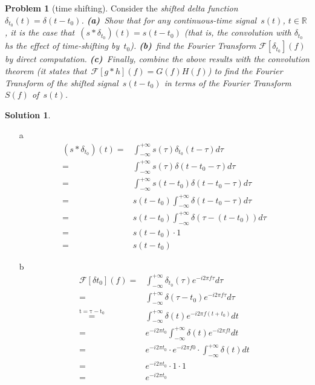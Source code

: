 \documentclass[11pt]{article}
\theoremstyle{plain}
\theoremstyle{definition}
\newtheorem{problem}{Problem}
\newtheorem{solution}{Solution}
\theoremstyle{remark}
\begin{document}
\begin{problem}[time shifting]
Consider the \em shifted \em delta function
$\delta_{t_0}(t)=\delta(t-t_0)$. {\bf(a)}~Show that
for any continuous-time signal~$s(t)$, $t\in \mathbb{R}$,
it is the case that~$(s\ast\delta_{t_0})(t)=s(t-t_0)$
(that is, the convolution with $\delta_{t_0}$ hs the effect
of time-shifting by~$t_0$). {\bf(b)}~find the 
Fourier Transform $\mathcal{F}[\delta_{t_0}](f)$
by direct computation.  
{\bf(c)}~Finally, 
combine the above results with the convolution theorem
(it states that~$\mathcal{F}[g\ast h](f)=G(f)H(f)$)
to find the Fourier Transform of the shifted signal~$s(t-t_0)$
in terms of the Fourier Transform~$S(f)$ of~$s(t)$.
\end{problem}
\begin{solution}
	\begin{enumerate}
		\item[a] 	
		\begin{eqnarray*}
			(s*\delta_{t_0})(t) = & \int_{-\infty}^{+\infty} s(\tau) \delta_{t_0} (t-\tau) d\tau\\
			= & \int_{-\infty}^{+\infty} s(\tau) \delta (t- t_0 -\tau) d\tau\\
			= & \int_{-\infty}^{+\infty} s(t-t_0) \delta(t-t_0 -\tau) d\tau \\
			= & s(t-t_0) \int_{-\infty}^{+\infty} \delta (t-t_0 -\tau) d\tau \\
			= & s(t-t_0) \int_{-\infty}^{+\infty} \delta (\tau - (t-t_0)) d\tau \\
			= & s(t-t_0) \cdot 1 \\
			= & s(t-t_0)
		\end{eqnarray*}
		
		\item[b]
		\begin{eqnarray*}
		\mathcal{F}[\delta t_0] (f) = & \int_{-\infty}^{+\infty} \delta_{t_0} (\tau) e^{-i 2\pi f \tau} d\tau\\
			= & \int_{-\infty}^{+\infty} \delta (\tau - t_0) e^{-i2\pi f \tau} d\tau\\
			 \overset{\mathrm{t = \tau - t_0}}{=} & \int_{-\infty}^{+\infty} \delta (t) e^{-i 2\pi f(t+t_0)} dt\\
			= & e^{-i2\pi t_0} \int_{-\infty}^{+\infty}  \delta (t) e^{-i2\pi ft}dt\\
			= &  e^{-i2\pi t_0} \cdot e^{-i2\pi f 0} \cdot \int_{-\infty}^{+\infty} \delta (t) dt\\
			= & e^{-i2\pi t_0}  \cdot 1 \cdot 1\\
			= & e^{-i2\pi t_0}
		\end{eqnarray*}
		

\end{enumerate}
\end{solution}
\end{document}
